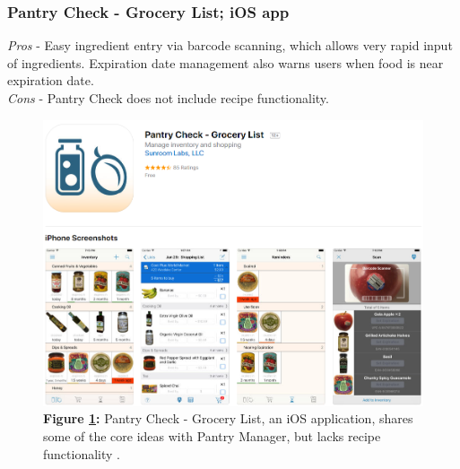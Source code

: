 \documentclass{sigchi}
\begin{document}
	\subsubsection{\textbf{Pantry Check - Grocery List}; iOS app}
		\textit{Pros} - Easy ingredient entry via barcode scanning, which allows very rapid input of ingredients. Expiration date management also warns users when food is near expiration date.\\
		\textit{Cons} - Pantry Check does not include recipe functionality.
		\begin{figure}[htb!]
		\centering
			\includegraphics[width=0.8\columnwidth]{pantry_check.png}\\
			\textbf{Figure \ref{fig:pcheck}:} Pantry Check - Grocery List, an iOS application, shares some of the core ideas with Pantry Manager, but lacks recipe functionality \cite{pantrycheck}.
			\label{fig:pcheck}
		\end{figure}
\end{document}
